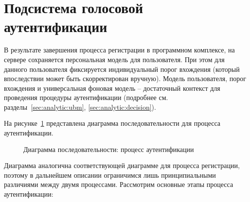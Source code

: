 \section{Подсистема голосовой аутентификации}
\label{sec:construct:verification}

В результате завершения процесса регистрации в программном комплексе,
на сервере сохраняется персональная модель для пользователя. При этом для
данного пользователя фиксируется индивидуальный порог вхождения (который
впоследствии может быть скорректирован вручную). Модель пользователя, порог
вхождения и универсальная фоновая модель -- достаточный контекст для проведения
процедуры аутентификации (подробнее см. разделы~\ref{sec:analytic:ubm},
\ref{sec:analytic:decision}).

На рисунке~\ref{fig:seq_verification} представлена диаграмма последовательности
для процесса аутентификации.

\begin{figure}[htp!]
    \center{
        \fontsize{12}{14}\selectfont
        
    }
    \caption{Диаграмма последовательности: процесс аутентификации}
    \label{fig:seq_verification}
\end{figure}

Диаграмма аналогична соответствующей диаграмме для процесса регистрации, поэтому
в дальнейшем описании ограничимся лишь принципиальными различиями между двумя
процессами. Рассмотрим основные этапы процесса аутентификации:

